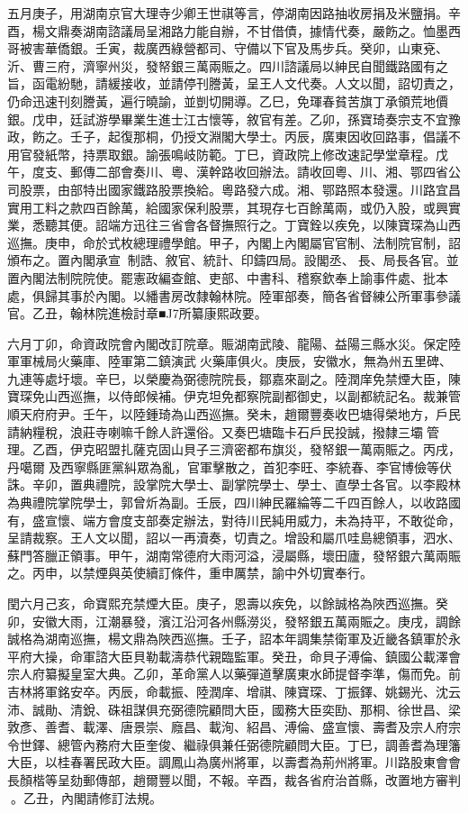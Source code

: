 \begin{pinyinscope}
五月庚子，用湖南京官大理寺少卿王世祺等言，停湖南因路抽收房捐及米鹽捐。辛酉，楊文鼎奏湖南諮議局呈湘路力能自辦，不甘借債，據情代奏，嚴飭之。恤墨西哥被害華僑銀。壬寅，裁廣西綠營都司、守備以下官及馬步兵。癸卯，山東兗、沂、曹三府，濟寧州災，發帑銀三萬兩賑之。四川諮議局以紳民自聞鐵路國有之旨，函電紛馳，請緩接收，並請停刊謄黃，呈王人文代奏。人文以聞，詔切責之，仍命迅速刊刻謄黃，遍行曉諭，並剴切開導。乙巳，免琿春貧苦旗丁承領荒地價銀。戊申，廷試游學畢業生進士江古懷等，敘官有差。乙卯，孫寶琦奏宗支不宜豫政，飭之。壬子，起復那桐，仍授文淵閣大學士。丙辰，廣東因收回路事，倡議不用官發紙幣，持票取銀。諭張鳴岐防範。丁巳，資政院上修改速記學堂章程。戊午，度支、郵傳二部會奏川、粵、漢幹路收回辦法。請收回粵、川、湘、鄂四省公司股票，由部特出國家鐵路股票換給。粵路發六成。湘、鄂路照本發還。川路宜昌實用工料之款四百餘萬，給國家保利股票，其現存七百餘萬兩，或仍入股，或興實業，悉聽其便。詔端方迅往三省會各督撫照行之。丁寶銓以疾免，以陳寶琛為山西巡撫。庚申，命於式枚總理禮學館。甲子，內閣上內閣屬官官制、法制院官制，詔頒布之。置內閣承宣，制誥、敘官、統計、印鑄四局。設閣丞、長、局長各官。並置內閣法制院院使。罷憲政編查館、吏部、中書科、稽察欽奉上諭事件處、批本處，俱歸其事於內閣。以繙書房改隸翰林院。陸軍部奏，簡各省督練公所軍事參議官。乙丑，翰林院進檢討章■J7所纂康熙政要。

六月丁卯，命資政院會內閣改訂院章。賑湖南武陵、龍陽、益陽三縣水災。保定陸軍軍械局火藥庫、陸軍第二鎮演武火藥庫俱火。庚辰，安徽水，無為州五里碑、九連等處圩壞。辛巳，以榮慶為弼德院院長，鄒嘉來副之。陸潤庠免禁煙大臣，陳寶琛免山西巡撫，以侍郎候補。伊克坦免都察院副都御史，以副都統記名。裁兼管順天府府尹。壬午，以陸鍾琦為山西巡撫。癸未，趙爾豐奏收巴塘得榮地方，戶民請納糧稅，浪莊寺喇嘛千餘人許還俗。又奏巴塘臨卡石戶民投誠，撥隸三壩管理。乙酉，伊克昭盟扎薩克固山貝子三濟密都布旗災，發帑銀一萬兩賑之。丙戌，丹噶爾及西寧縣匪黨糾眾為亂，官軍擊散之，首犯李旺、李統春、李官博儉等伏誅。辛卯，置典禮院，設掌院大學士、副掌院學士、學士、直學士各官。以李殿林為典禮院掌院學士，郭曾炘為副。壬辰，四川紳民羅綸等二千四百餘人，以收路國有，盛宣懷、端方會度支部奏定辦法，對待川民純用威力，未為持平，不敢從命，呈請裁察。王人文以聞，詔以一再瀆奏，切責之。增設和屬爪哇島總領事，泗水、蘇門答臘正領事。甲午，湖南常德府大雨河溢，浸屬縣，壞田廬，發帑銀六萬兩賑之。丙申，以禁煙與英使續訂條件，重申厲禁，諭中外切實奉行。

閏六月己亥，命寶熙充禁煙大臣。庚子，恩壽以疾免，以餘誠格為陜西巡撫。癸卯，安徽大雨，江潮暴發，濱江沿河各州縣澇災，發帑銀五萬兩賑之。庚戌，調餘誠格為湖南巡撫，楊文鼎為陜西巡撫。壬子，詔本年調集禁衛軍及近畿各鎮軍於永平府大操，命軍諮大臣貝勒載濤恭代親臨監軍。癸丑，命貝子溥倫、鎮國公載澤會宗人府纂擬皇室大典。乙卯，革命黨人以藥彈道擊廣東水師提督李準，傷而免。前吉林將軍銘安卒。丙辰，命載振、陸潤庠、增祺、陳寶琛、丁振鐸、姚錫光、沈云沛、誠勛、清銳、硃祖謀俱充弼德院顧問大臣，國務大臣奕劻、那桐、徐世昌、梁敦彥、善耆、載澤、唐景崇、廕昌、載洵、紹昌、溥倫、盛宣懷、壽耆及宗人府宗令世鐸、總管內務府大臣奎俊、繼祿俱兼任弼德院顧問大臣。丁巳，調善耆為理籓大臣，以桂春署民政大臣。調鳳山為廣州將軍，以壽耆為荊州將軍。川路股東會會長顏楷等呈劾郵傳部，趙爾豐以聞，不報。辛酉，裁各省府治首縣，改置地方審判。乙丑，內閣請修訂法規。


\end{pinyinscope}
